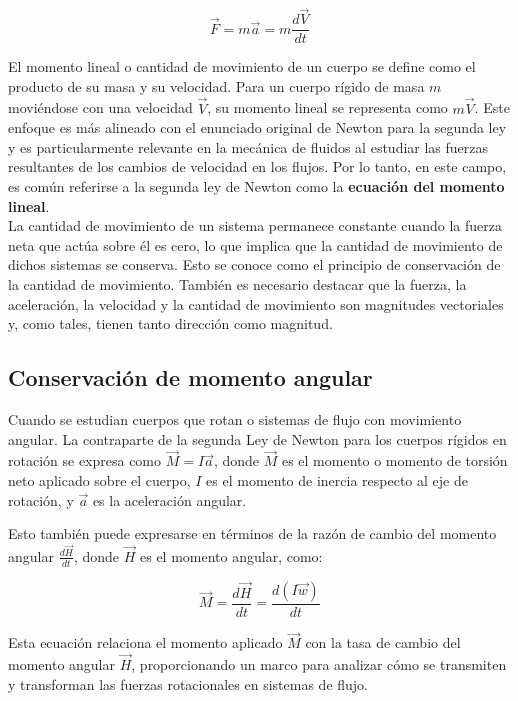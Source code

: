 \documentclass[10pt, oneside]{article}
\begin{document}
 \begin{equation}
\vec{F} = m \vec{a}  = m \frac{d\vec{V}}{dt} 
 \end{equation}
 
El momento lineal o cantidad de movimiento de un cuerpo se define como el producto de su masa y su velocidad. Para un cuerpo rígido de masa \( m \) moviéndose con una velocidad \( \vec{V} \), su momento lineal se representa como \( m \vec{V} \). Este enfoque es más alineado con el enunciado original de Newton para la segunda ley y es particularmente relevante en la mecánica de fluidos al estudiar las fuerzas resultantes de los cambios de velocidad en los flujos. Por lo tanto, en este campo, es común referirse a la segunda ley de Newton como la \textbf{ecuación del momento lineal}.\\

La cantidad de movimiento de un sistema permanece constante cuando la fuerza neta que actúa sobre él es cero, lo que implica que la cantidad de movimiento de dichos sistemas se conserva. Esto se conoce como el principio de conservación de la cantidad de movimiento. También es necesario destacar que la fuerza, la aceleración, la velocidad y la cantidad de movimiento son magnitudes vectoriales y, como tales, tienen tanto dirección como magnitud.

\subsection{Conservación de momento angular}

Cuando se estudian cuerpos que rotan o sistemas de flujo con movimiento angular. La contraparte de la segunda Ley de Newton para los cuerpos rígidos en rotación se expresa como \( \vec{M} = I \vec{a} \), donde \( \vec{M} \) es el momento o momento de torsión neto aplicado sobre el cuerpo, \( I \) es el momento de inercia respecto al eje de rotación, y \( \vec{a} \) es la aceleración angular.

Esto también puede expresarse en términos de la razón de cambio del momento angular \( \frac{d\vec{H}}{dt} \), donde \( \vec{H} \) es el momento angular, como:

\begin{equation}
\vec{M} = \frac{d\vec{H}}{dt}  = \frac{d(I\vec{w})}{dt} 
\end{equation}

Esta ecuación relaciona el momento aplicado \( \vec{M} \) con la tasa de cambio del momento angular \( \vec{H} \), proporcionando un marco para analizar cómo se transmiten y transforman las fuerzas rotacionales en sistemas de flujo.
\end{document}
